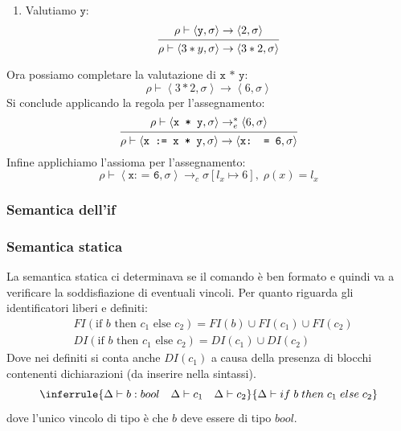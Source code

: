 \documentclass[a4paper]{article}
\begin{document}
\begin{Example}{}
\begin{enumerate}
  \item Valutiamo \( \texttt{y} \):
    \[
      \begin{prooftree}
        \hypo{ 
          \rho \vdash \left< \texttt{y}, \sigma  \right> \to \left< 2, \sigma  \right>
        }
        \infer1{ 
          \rho \vdash \left< 3 * y, \sigma  \right> \to
          \left< 3 * 2, \sigma  \right>
        }
      \end{prooftree}
    \]
\end{enumerate}
Ora possiamo completare la valutazione di \( \texttt{x * y} \):
\[
  \rho  \vdash \left< 3 * 2, \sigma  \right> \to \left< 6, \sigma  \right>
\] 
Si conclude applicando la regola per l'assegnamento:
\[
  \begin{prooftree}
    \hypo{ 
      \rho \vdash \left< \texttt{x * y}, \sigma  \right> \to^*_e \left< 6, \sigma  \right>
    }
    \infer1{ 
      \rho \vdash \left< \texttt{x := x * y}, \sigma  \right>
      \to \left< \texttt{x: = 6}, \sigma  \right>
    }
  \end{prooftree}
\] 
Infine applichiamo l'assioma per l'assegnamento:
\[
  \rho \vdash \left< \texttt{x: = 6}, \sigma  \right> \to_c
  \sigma[l_x \mapsto 6], \; \rho(x) = l_x
\] 
\end{Example}


\subsubsection{Semantica dell'if}

\subsubsection*{Semantica statica}

La semantica statica ci determinava se il comando è ben formato
e quindi va a verificare la soddisfiazione di eventuali vincoli.
Per quanto riguarda gli identificatori liberi e definiti:
\[
\begin{aligned}
  &FI(\text{if $b$ then $c_1$ else $c_2$}) = FI(b) \cup FI(c_1) \cup FI(c_2)\\
  &DI(\text{if $b$ then $c_1$ else $c_2$}) = DI(c_1) \cup DI(c_2)
\end{aligned}
\]
Dove nei definiti si conta anche $DI(c_1)$ a causa della presenza di blocchi 
contenenti dichiarazioni  (da inserire nella sintassi).
\[
  \inferrule 
  {\Delta \vdash b : bool \quad \Delta \vdash c_1\quad \Delta \vdash c_2}
  {\Delta \vdash if \; b \; then \; c_1 \; else \; c_2}
\]
dove l'unico vincolo di tipo è che $b$ deve essere di tipo $bool$.
\end{document}
